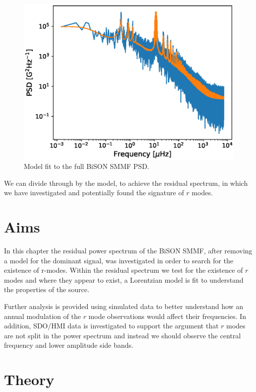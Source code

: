 \begin{figure}[!ht]
	\centering
	\includegraphics[width=0.7\columnwidth]{SMMF_PSD_fit.eps}
	\caption{Model fit to the full BiSON SMMF PSD.}
	\label{fig:BiSON_PSD}
\end{figure}

We can divide through by the model, to achieve the residual spectrum, in which we have investigated and potentially found the signature of $r$ modes.




\section{Aims}\label{sec:r-mode_aims}

In this chapter the residual power spectrum of the BiSON SMMF, after removing a model for the dominant signal, was investigated in order to search for the existence of r-modes. Within the residual spectrum we test for the existence of $r$ modes and where they appear to exist, a Lorentzian model is fit to understand the properties of the source.

Further analysis is provided using simulated data to better understand how an annual modulation of the $r$ mode observations would affect their frequencies. In addition, SDO/HMI data is investigated to support the argument that $r$ modes are not split in the power spectrum and instead we should observe the central frequency and lower amplitude side bands.



\section{Theory}\label{sec:r-mode_theory}

